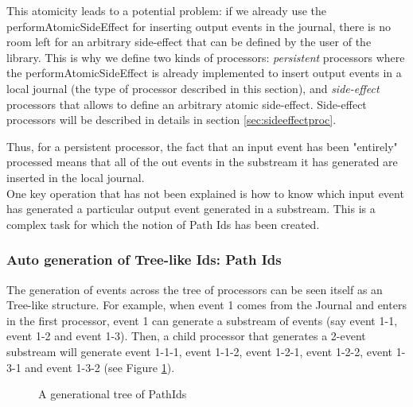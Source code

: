 This atomicity leads to a potential problem: if we already use the performAtomicSideEffect for inserting output events in the journal, there is no room left for an arbitrary side-effect that can be defined by the user of the library. This is why we define two kinds of processors: \textit{persistent} processors where the performAtomicSideEffect is already implemented to insert output events in a local journal (the type of processor described in this section), and \textit{side-effect} processors that allows to define
an arbitrary atomic side-effect. Side-effect processors will be described in details in section \ref{sec:sideeffectproc}.

Thus, for a persistent processor, the fact that an input event has been "entirely" processed means that all of the out events in the substream it has generated are inserted in the local journal.
\\

One key operation that has not been explained is how to know which input event has generated a particular output event generated in a substream. This is a complex task for which the notion of Path Ids has been created.

\subsubsection{Auto generation of Tree-like Ids: Path Ids}

The generation of events across the tree of processors can be seen itself as an Tree-like structure. For example, when event 1 comes from the Journal and enters in the first
processor, event 1 can generate a substream of events (say event 1-1, event 1-2 and event 1-3). Then, a child processor that generates a 2-event substream
will generate event 1-1-1, event 1-1-2, event 1-2-1, event 1-2-2, event 1-3-1 and event 1-3-2 (see Figure \ref{fig:treepathid}).

\begin{figure}[h]
  \begin{center} 
    \caption{A generational tree of PathIds}
    \label{fig:treepathid}
  \end{center}
\end{figure}

